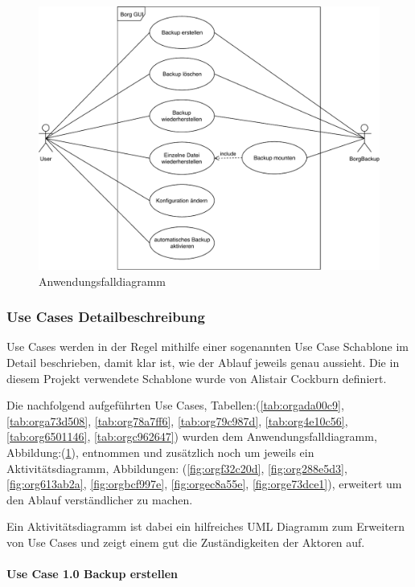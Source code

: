 \newpage
\begin{landscape}
\begin{figure}[htbp]
\centering
\includegraphics[width=.75\linewidth]{pictures/use_case.pdf}
\caption{\label{fig:org49a405a}
Anwendungsfalldiagramm}
\end{figure}
\end{landscape}
\newpage

\subsubsection{Use Cases Detailbeschreibung}
\label{sec:org7eb46b4}

Use Cases werden in der Regel mithilfe einer sogenannten Use Case Schablone im
Detail beschrieben, damit klar ist, wie der Ablauf jeweils genau aussieht. Die
in diesem Projekt verwendete Schablone wurde von Alistair Cockburn definiert.

Die nachfolgend aufgeführten Use Cases, Tabellen:(\ref{tab:orgada00c9}, \ref{tab:orga73d508},
\ref{tab:org78a7ff6}, \ref{tab:org79c987d}, \ref{tab:org4e10c56}, \ref{tab:org6501146}, \ref{tab:orgc962647})
wurden dem Anwendungsfalldiagramm, Abbildung:(\ref{fig:org49a405a}), entnommen und
zusätzlich noch um jeweils ein Aktivitätsdiagramm, Abbildungen:
(\ref{fig:orgf32c20d}, \ref{fig:org288e5d3}, \ref{fig:org613ab2a},
\ref{fig:orgbcf997e}, \ref{fig:orgec8a55e}, \ref{fig:orge73dce1}), erweitert
um den Ablauf verständlicher zu machen.

Ein Aktivitätsdiagramm ist dabei ein hilfreiches UML Diagramm zum Erweitern von
Use Cases und zeigt einem gut die Zuständigkeiten der Aktoren auf.

\newpage
\paragraph{Use Case 1.0 Backup erstellen}
\label{sec:orgf1b47d8}

